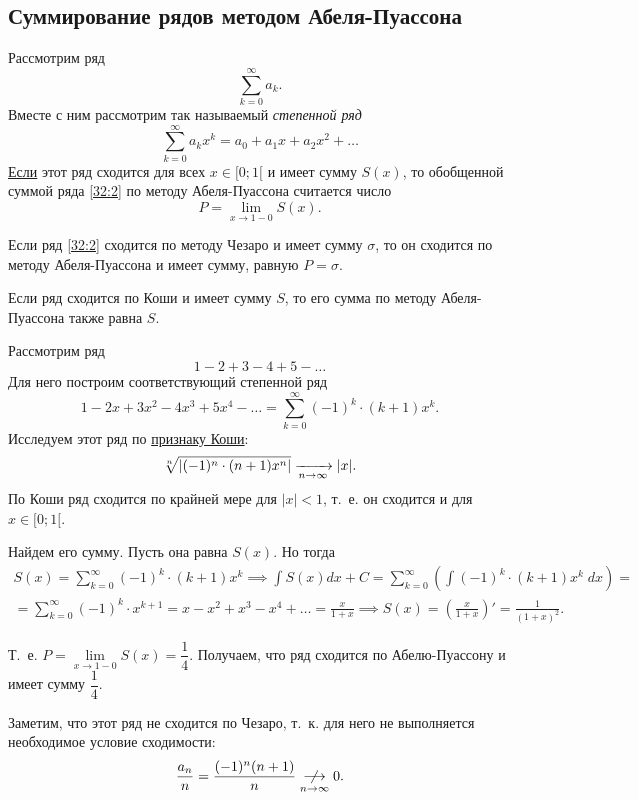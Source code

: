 \documentclass[../../main.tex]{subfiles}
\begin{document}
\subsection{Суммирование рядов методом Абеля-Пуассона}

Рассмотрим ряд
\begin{equation}
 \label{32:2}
 \sum\limits_{k=0}^\infty a_k.
\end{equation}
Вместе с ним рассмотрим так называемый \emph{степенной ряд}
\[\sum\limits_{k=0}^\infty a_kx^k = a_0 + a_1x + a_2x^2 + \dots\]
\underline{Если} этот ряд сходится для всех $x \in [0;1[$ и имеет сумму 
$S(x)$, то обобщенной суммой ряда \eqref{32:2} по методу Абеля-Пуассона 
считается число \[P = \lim_{x\to1-0}S(x).\]

\begin{thm}
 Если ряд \eqref{32:2} сходится по методу Чезаро и имеет сумму $\sigma$, то он 
 сходится по методу Абеля-Пуассона и имеет сумму, равную $P = \sigma$.
\end{thm}

\begin{crl*}
 Если ряд сходится по Коши и имеет сумму $S$, то его сумма по методу 
 Абеля-Пуассона также равна $S$.
\end{crl*}

\begin{exmp}
Рассмотрим ряд \[1-2+3-4+5-\dots\] Для него построим соответствующий степенной 
ряд \[1-2x+3x^2-4x^3 + 5x^4 - \dots = \sum_{k=0}^\infty (-1)^k\cdot(k+1)x^k.\]
Исследуем этот ряд по \hyperref[lec27:cauchy]{признаку Коши}:
\[\sqrt[n]{\left|{(-1)^n\cdot(n+1)x^n}\right|} \xrightarrow[n\to\infty]{} |x|.\]
По Коши ряд сходится по крайней мере для $|x| < 1$, т.~е. он сходится и для $x 
\in [0;1[$.

Найдем его сумму. Пусть она равна $S(x)$. Но тогда
\begin{gather*}
 S(x) = \sum\limits_{k=0}^\infty (-1)^k\cdot(k+1)x^k \implies \int S(x)dx + C 
 = \sum\limits_{k=0}^\infty \left(\int (-1)^k\cdot(k+1)x^k\;dx\right) = \\ =
 \sum\limits_{k=0}^\infty (-1)^k\cdot x^{k+1} =
 x - x^2 + x^3 - x^4 + \dots = \frac x{1+x} \implies S(x) = \left(\frac 
 x{1+x}\right)' = \frac 1{(1+x)^2}.
\end{gather*}

Т.~е. $P = \lim\limits_{x\to1-0} S(x) = \dfrac14$. Получаем, что ряд сходится 
по Абелю-Пуассону и имеет сумму $\dfrac14$.

Заметим, что этот ряд не сходится по Чезаро, т.~к. для него не выполняется 
необходимое условие сходимости: \[\frac{a_n}n = \frac{(-1)^n(n+1)}n 
\underset{n\to\infty}{\centernot\longrightarrow} 0.\]
\end{exmp}
\end{document}
